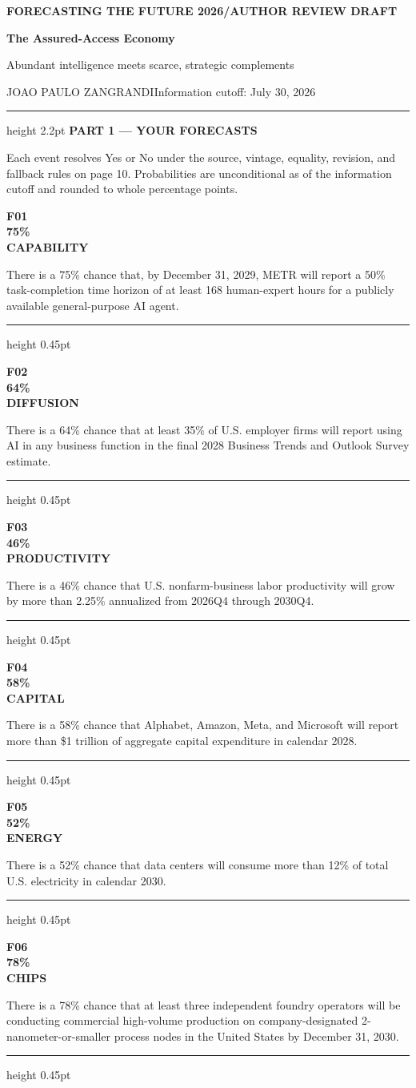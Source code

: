 \documentclass[10pt,letterpaper]{article}
\newcommand{\eyebrow}[1]{{\sffamily\fontsize{7.8}{9}\selectfont\color{accent}\bfseries\MakeUppercase{#1}}}
\newcommand{\forecast}[5]{%
  \noindent
  \begin{minipage}[t]{0.108\textwidth}
    \vspace{0pt}
    {\sffamily\fontsize{7}{8}\selectfont\color{accent}\bfseries #1}\\[-2pt]
    {\sffamily\fontsize{20}{20}\selectfont\color{accent}\bfseries #2}\\[-2pt]
    {\sffamily\fontsize{5.9}{6.5}\selectfont\color{muted}\bfseries\MakeUppercase{#3}}
  \end{minipage}\hfill
  \begin{minipage}[t]{0.862\textwidth}
    \vspace{2pt}
    #4
  \end{minipage}
  \par\vspace{3.8pt}\color{rule}\hrule height 0.45pt\color{ink}\vspace{3.8pt}
}
\begin{document}
\color{ink}
\fontsize{9.65}{11.55}\selectfont

\thispagestyle{firstpage}
\noindent\colorbox{cover}{\parbox{\dimexpr\textwidth-2\fboxsep\relax}{
  \vspace{8pt}
  {\sffamily\fontsize{8}{9}\selectfont\color{white}\bfseries FORECASTING THE FUTURE 2026\quad/\quad AUTHOR REVIEW DRAFT\par}
  \vspace{9pt}
  {\sffamily\fontsize{25}{28}\selectfont\color{white}\bfseries The Assured-Access Economy\par}
  \vspace{3pt}
  {\sffamily\fontsize{12}{14}\selectfont\color{white}Abundant intelligence meets scarce, strategic complements\par}
  \vspace{12pt}
  {\sffamily\fontsize{7.5}{9}\selectfont\color{white}JOAO PAULO ZANGRANDI\hfill Information cutoff: July 30, 2026\par}
  \vspace{7pt}
}}
\color{copper}\hrule height 2.2pt\color{ink}
\vspace{7pt}
\eyebrow{Part 1 --- Your Forecasts}
\vspace{4pt}

Each event resolves Yes or No under the source, vintage, equality, revision,
and fallback rules on page 10. Probabilities are unconditional as of the
information cutoff and rounded to whole percentage points.

\vspace{2pt}
\forecast{F01}{75\%}{Capability}{There is a 75\% chance that, by December 31, 2029, METR will report a 50\% task-completion time horizon of at least 168 human-expert hours for a publicly available general-purpose AI agent.}{blue}
\vfill
\forecast{F02}{64\%}{Diffusion}{There is a 64\% chance that at least 35\% of U.S. employer firms will report using AI in any business function in the final 2028 Business Trends and Outlook Survey estimate.}{teal}
\vfill
\forecast{F03}{46\%}{Productivity}{There is a 46\% chance that U.S. nonfarm-business labor productivity will grow by more than 2.25\% annualized from 2026Q4 through 2030Q4.}{gold}
\vfill
\forecast{F04}{58\%}{Capital}{There is a 58\% chance that Alphabet, Amazon, Meta, and Microsoft will report more than \$1 trillion of aggregate capital expenditure in calendar 2028.}{red}
\vfill
\forecast{F05}{52\%}{Energy}{There is a 52\% chance that data centers will consume more than 12\% of total U.S. electricity in calendar 2030.}{teal}
\vfill
\forecast{F06}{78\%}{Chips}{There is a 78\% chance that at least three independent foundry operators will be conducting commercial high-volume production on company-designated 2-nanometer-or-smaller process nodes in the United States by December 31, 2030.}{blue}
\end{document}
